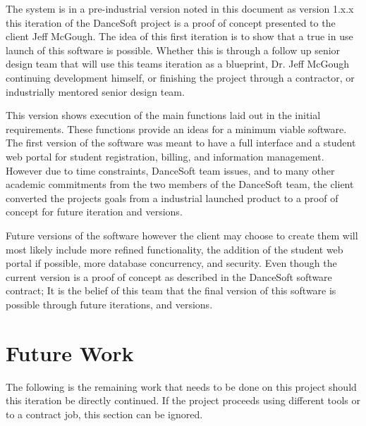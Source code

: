 The system is in a pre-industrial version noted in this document as version 1.x.x this iteration of the DanceSoft project is a proof of concept presented to the client Jeff McGough. The idea of this first iteration is to show that a true in use launch of this software is possible. Whether this is through a follow up senior design team that will use this teams iteration as a blueprint, Dr. Jeff McGough continuing development himself, or finishing the project through a contractor, or industrially mentored senior design team.

This version shows execution of the main functions laid out in the initial requirements. These functions provide an ideas for a minimum viable software. The first version of the software was meant to have a full interface and a student web portal for student registration, billing, and information management. However due to time constraints, DanceSoft team issues, and to many other academic commitments from the two members of the DanceSoft team, the client converted the projects goals from a industrial launched product to a proof of concept for future iteration and versions. 

Future versions of the software however the client may choose to create them will most likely include more refined functionality, the addition of the student web portal if possible, more database concurrency, and security. Even though the current version is a proof of concept as described in the DanceSoft software contract; It is the belief of this team that the final version of this software is possible through future iterations, and versions.


\section{Future Work}
The following is the remaining work that needs to be done on this project should this iteration be directly continued. If the project proceeds using different tools or to a contract job, this section can be ignored.


